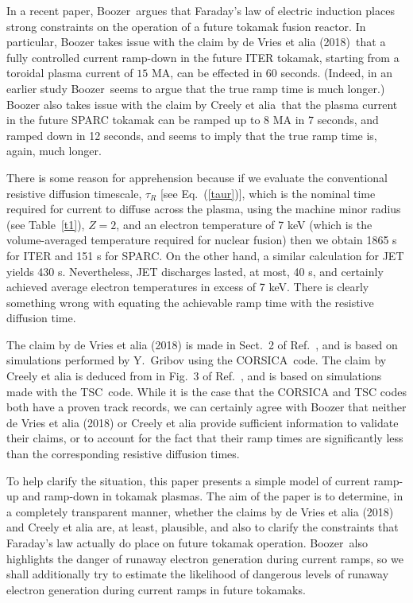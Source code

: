 \documentclass{iopjournal}
\begin{document}
In a recent paper, Boozer\,\cite{boozer,boozera} argues  that Faraday's law of electric induction places strong constraints on the operation of a future  tokamak fusion reactor. 
In particular, Boozer takes issue with the claim by de Vries et alia (2018)\,\cite{deVries} that a fully controlled current ramp-down in the future ITER tokamak, starting from a toroidal plasma current of $15$ MA,
can be effected in 60 seconds. (Indeed, in an earlier study Boozer\,\cite{boozer1} seems to argue that the true ramp time is much longer.)  Boozer also takes issue with the claim by Creely et alia\,\cite{creely} that the plasma current in the future SPARC tokamak can be ramped up to 8 MA in
7 seconds, and ramped down in 12 seconds, and seems to imply that the true ramp time is, again, much longer. 

There is some reason for apprehension because if we evaluate the conventional resistive diffusion timescale, $\tau_R$ [see Eq.~(\ref{taur})], which is the nominal
time required  for current to diffuse across the plasma, using the machine minor radius (see Table~\ref{t1}), $Z=2$, and
an electron temperature of 7 keV (which is the volume-averaged temperature required for nuclear fusion) then we obtain 1865 s for ITER and 151 s for SPARC. On the other hand, a similar
calculation for JET yields 430 s. Nevertheless, JET discharges lasted, at most, 40 s, and certainly achieved average electron temperatures in excess of 7 keV. There is clearly something wrong with equating the achievable ramp time with the resistive diffusion time. 

The claim by de Vries et alia (2018) is
made in Sect.~2 of Ref.~\cite{deVries}, and is based on simulations performed by Y.~Gribov using  the CORSICA\,\cite{corsica,corsica1}  code. The claim by Creely et alia is deduced from 
in Fig.~3 of Ref.~\cite{creely}, and is based on simulations made with the TSC\,\cite{tsc}   code. While it is the case that the  CORSICA and TSC codes both have a proven 
track records, we can certainly agree with Boozer that neither de Vries et alia (2018) or Creely et alia provide sufficient information to validate their claims, or to account for the
fact that their ramp times are significantly less than the  corresponding resistive diffusion times. 

To help clarify the situation, this paper presents a simple model of current ramp-up and ramp-down in tokamak plasmas. 
The aim of the paper is
to determine, in a completely transparent manner, whether the claims by de Vries et alia (2018) and Creely et alia are, at least, plausible, and also to clarify the constraints that Faraday's law
actually do place on future tokamak operation. Boozer\,\cite{boozer,boozera}  also highlights the danger
of runaway electron generation during current ramps, so we shall additionally try to estimate the likelihood of dangerous levels of  runaway electron generation during current ramps
in  future tokamaks.  
\end{document}
